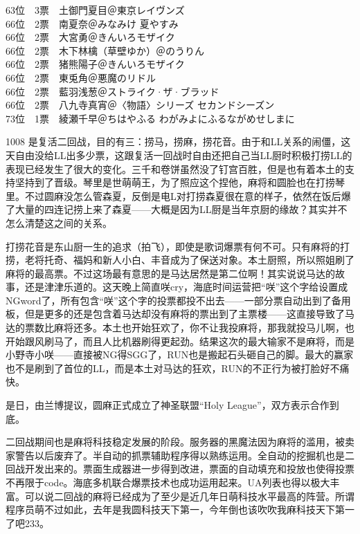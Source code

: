 {    63位　3票　土御門夏目＠東京レイヴンズ                                   \\
    66位　2票　南夏奈＠みなみけ 夏やすみ                                    \\
    66位　2票　大宮勇＠きんいろモザイク                                     \\
    66位　2票　木下林檎（草壁ゆか）＠のうりん                               \\
    66位　2票　猪熊陽子＠きんいろモザイク                                   \\
    66位　2票　東兎角＠悪魔のリドル                                         \\
    66位　2票　藍羽浅葱＠ストライク·ザ·ブラッド                           \\
    66位　2票　八九寺真宵＠〈物語〉シリーズ セカンドシーズン                \\
    73位　1票　綾瀬千早＠ちはやふる わがみよにふるながめせしまに            \\
}

1008 是复活二回战，目的有三：捞马，捞麻，捞花音。由于和LL关系的闹僵，这天自由没给LL出多少票，这跟复活一回战时自由还把自己当LL厨时积极打捞LL的表现已经发生了很大的变化。三千和卷饼虽然没了钉宫百胜，但是也有着本土的支持坚持到了晋级。琴里是世萌萌王，为了照应这个捏他，麻将和圆脸也在打捞琴里。不过圆麻没怎么管森夏，反倒是电L对打捞森夏很在意的样子，依然在饭后爆了大量的四连记捞上来了森夏——大概是因为LL厨是当年京厨的缘故？其实并不怎么清楚这之间的关系。

打捞花音是东山厨一生的追求（拍飞），即使是歌词爆票有何不可。只有麻将的打捞，老将托奇、福妈和新人小白、丰音成为了保送对象。本土厨照，所以照姐刷了麻将的最高票。不过这场最有意思的是马达居然是第二位啊！其实说说马达的故事，还是津津乐道的。这天晚上简直咲cry，海底时间运营把“咲”这个字给设置成NGword了，所有包含“咲”这个字的投票都投不出去——一部分票自动出到了备用板，但是更多的还是包含着马达却没有麻将的票出到了主票楼——这直接导致了马达的票数比麻将还多。本土也开始狂欢了，你不让我投麻将，那我就投马儿啊，也开始跟风刷马了，而且人比机器刷得更起劲。结果这次的最大输家不是麻将，而是小野寺小咲——直接被NG得SGG了，RUN也是搬起石头砸自己的脚。最大的赢家也不是刷到了首位的LL，而是本土对马达的狂欢，RUN的不正行为被打脸好不痛快。

是日，由兰博提议，圆麻正式成立了神圣联盟“Holy League”，双方表示合作到底。

二回战期间也是麻将科技稳定发展的阶段。服务器的黑魔法因为麻将的滥用，被卖家警告以后废弃了。半自动的抓票辅助程序得以熟练运用。全自动的挖掘机也是二回战开发出来的。票面生成器进一步得到改进，票面的自动填充和投放也使得投票不再限于code。海底多机联合爆票技术也成功运用起来。UA列表也得以极大丰富。可以说二回战的麻将已经成为了至少是近几年日萌科技水平最高的阵营。所谓程序员萌不过如此，去年是我圆科技天下第一，今年倒也该吹吹我麻科技天下第一了吧233。

